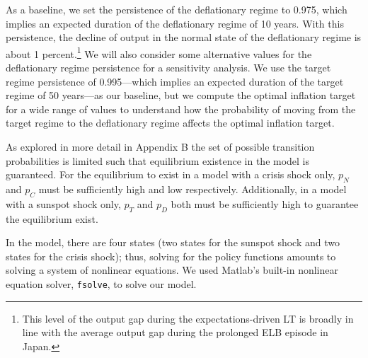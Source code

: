 \documentclass[11pt]{article}
\begin{document}
	As a baseline, we set the persistence of the deflationary regime to 0.975, which implies an expected duration of the deflationary regime of 10 years. With this persistence, the decline of output in the normal state of the deflationary regime is about 1 percent.\footnote{This level of the output gap during the expectations-driven LT is broadly in line with the average output gap during the prolonged ELB episode in Japan.} We will also consider some alternative values for the deflationary regime persistence for a sensitivity analysis. We use the target regime persistence of 0.995---which implies an expected duration of the target regime of 50 years---as our baseline, but we compute the optimal inflation target for a wide range of values to understand how the probability of moving from the target regime to the deflationary regime affects the optimal inflation target.

	As explored in more detail in Appendix B the set of possible transition probabilities is limited such that equilibrium existence in the model is guaranteed. For the equilibrium to exist in a model with a crisis shock only, $p_N$ and $p_C$ must be sufficiently high and low respectively. Additionally, in a model with a sunspot shock only, $p_T$ and $p_D$ both must be sufficiently high to guarantee the equilibrium exist.

	In the model, there are four states (two states for the sunspot shock and two states for the crisis shock); thus, solving for the policy functions amounts to solving a system of nonlinear equations. We used Matlab's built-in nonlinear equation solver, \texttt{fsolve}, to solve our model.


\end{document}
